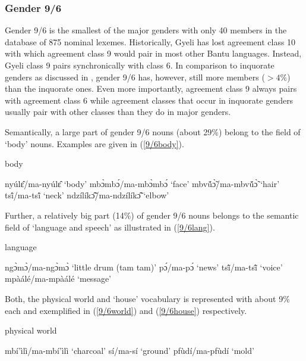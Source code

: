 \subsubsection{Gender 9/6}
\label{sec:9/6}

Gender 9/6 is the smallest of the major genders with only 40 members in the database of  875 nominal lexemes. Historically, Gyeli has lost agreement class 10 with which agreement class 9 would pair in most other Bantu languages. Instead, Gyeli class 9 pairs synchronically with class 6. In comparison to inquorate genders as discussed in , gender 9/6 has, however, still more members ($> 4\%$) than the inquorate ones. Even more importantly, agreement class 9 always pairs with agreement class 6 while agreement classes that occur in inquorate genders usually pair with other classes than they do in major genders. 

Semantically, a large part of gender 9/6 nouns (about 29\%) belong to the field of  `body' nouns. Examples are given in (\ref{9/6body}).


\begin{exe}
\ex\label{9/6body} body
\begin{xlist}
\ex nyúlɛ̂/ma-nyúlɛ̂ `body'
\ex mbɔ̀mbɔ́/ma-mbɔ̀mbɔ́ `face'
\ex mbvṹɔ̃̀/ma-mbvṹɔ̃̀ `hair'
\ex tsĩ́/ma-tsĩ́ `neck'
\ex ndzílíkɔ̃̂/ma-ndzílíkɔ̃̂ `elbow'
\end{xlist}
\end{exe}

\noindent Further, a relatively big part (14\%) of gender 9/6 nouns belongs to the semantic field of `language and speech' as illustrated in (\ref{9/6lang}).

\begin{exe}
\ex\label{9/6lang} language
\begin{xlist}
\ex ngɔ̀mɔ̀/ma-ngɔ̀mɔ̀ `little drum (tam tam)'
\ex pɔ́/ma-pɔ́ `news'
\ex tsĩ̂/ma-tsĩ̂ `voice'
\ex mpàálé/ma-mpàálé `message'
\end{xlist}
\end{exe}

\noindent Both, the physical world and `house' vocabulary is represented with about 9\% each and exemplified in (\ref{9/6world}) and (\ref{9/6house}) respectively.

\begin{exe}
\ex\label{9/6world} physical world
\begin{xlist}
\ex mbí'ìlì/ma-mbí'ìlì `charcoal'
\ex sí/ma-sí `ground'
\ex pfùdí/ma-pfùdí `mold'
\end{xlist}
\end{exe}

